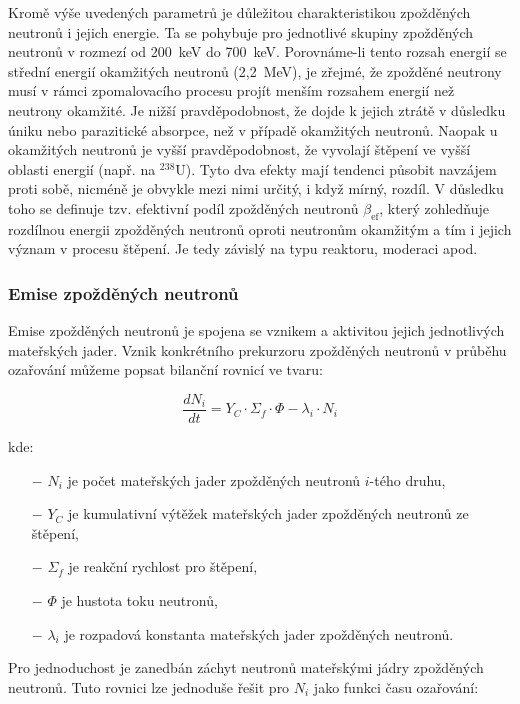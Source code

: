 Kromě výše uvedených parametrů je důležitou charakteristikou zpožděných neutronů i jejich energie. Ta se pohybuje pro jednotlivé skupiny zpožděných neutronů v rozmezí od 200~keV do 700~keV. Porovnáme-li tento rozsah energií se střední energií okamžitých neutronů (2,2~MeV), je zřejmé, že zpožděné neutrony musí v rámci zpomalovacího procesu projít menším rozsahem energií než neutrony okamžité. Je nižší pravděpodobnost, že dojde k jejich ztrátě v důsledku úniku nebo parazitické absorpce, než v případě okamžitých neutronů. Naopak u okamžitých neutronů je vyšší pravděpodobnost, že vyvolají štěpení ve vyšší oblasti energií (např. na $^{238}\text{U}$). Tyto dva efekty mají tendenci působit navzájem proti sobě, nicméně je obvykle mezi nimi určitý, i když mírný, rozdíl. V důsledku toho se definuje tzv. efektivní podíl zpožděných neutronů $\beta_\text{ef}$, který zohledňuje rozdílnou energii zpožděných neutronů oproti neutronům okamžitým a tím i jejich význam v procesu štěpení. Je tedy závislý na typu reaktoru, moderaci apod.

\subsubsection{Emise zpožděných neutronů}

Emise zpožděných neutronů je spojena se vznikem a aktivitou jejich jednotlivých mateřských jader. Vznik konkrétního prekurzoru zpožděných neutronů v průběhu ozařování můžeme popsat bilanční rovnicí ve tvaru:

\[
\frac{dN_i}{dt} = Y_C \cdot \Sigma_f \cdot \Phi - \lambda_i \cdot N_i
\]

kde:

\begin{itemize}%
    \item[$-$] $N_i$ je počet mateřských jader zpožděných neutronů $i$-tého druhu,
    \item[$-$] $Y_C$ je kumulativní výtěžek mateřských jader zpožděných neutronů ze štěpení,
    \item[$-$] $\Sigma_f$ je reakční rychlost pro štěpení,
    \item[$-$] $\Phi$ je hustota toku neutronů,
    \item[$-$] $\lambda_i$ je rozpadová konstanta mateřských jader zpožděných neutronů.
\end{itemize}

Pro jednoduchost je zanedbán záchyt neutronů mateřskými jádry zpožděných neutronů. Tuto rovnici lze jednoduše řešit pro $N_i$ jako funkci času ozařování:

